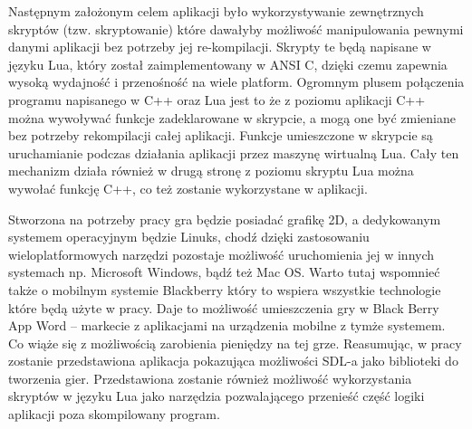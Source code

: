 Następnym założonym celem aplikacji było wykorzystywanie zewnętrznych skryptów (tzw. skryptowanie) które dawałyby możliwość manipulowania pewnymi danymi aplikacji bez potrzeby jej re-kompilacji. Skrypty te będą napisane w języku Lua, który został zaimplementowany w ANSI C, dzięki czemu zapewnia wysoką wydajność i przenośność na wiele platform. Ogromnym plusem połączenia programu napisanego w C++ oraz Lua jest to że z poziomu aplikacji C++ można wywoływać funkcje zadeklarowane w skrypcie, a mogą one być zmieniane bez potrzeby rekompilacji całej aplikacji. Funkcje umieszczone w skrypcie są uruchamianie podczas działania aplikacji przez maszynę wirtualną Lua. Cały ten mechanizm działa również w drugą stronę z poziomu skryptu Lua można wywołać funkcję C++, co też zostanie wykorzystane w aplikacji.

Stworzona na potrzeby pracy gra będzie posiadać grafikę 2D, a dedykowanym systemem operacyjnym będzie Linuks, chodź dzięki zastosowaniu wieloplatformowych narzędzi pozostaje możliwość uruchomienia jej w innych systemach np. Microsoft Windows, bądź też Mac OS. Warto tutaj wspomnieć także o mobilnym systemie Blackberry  który to wspiera wszystkie technologie które będą użyte w pracy. Daje to możliwość umieszczenia gry w Black Berry App Word – markecie z aplikacjami na urządzenia mobilne z tymże systemem. Co wiąże się z możliwością zarobienia pieniędzy na tej grze. Reasumując, w pracy zostanie przedstawiona aplikacja pokazująca możliwości SDL-a jako biblioteki do tworzenia gier. Przedstawiona zostanie również możliwość wykorzystania skryptów w języku Lua jako narzędzia pozwalającego przenieść część logiki aplikacji poza skompilowany
program.

